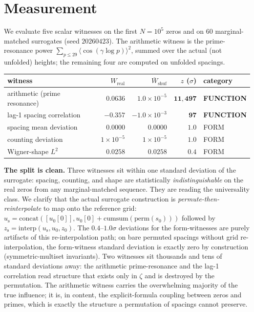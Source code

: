 \documentclass[11pt]{article}
\begin{document}
\section{Measurement}\label{sec:meas}

We evaluate five scalar witnesses on the first $N=10^5$ zeros and on $60$ marginal-matched surrogates (seed $20260423$). The arithmetic witness is the prime-resonance power $\sum_{p\le29}\langle\cos(\gamma\log p)\rangle^2$, summed over the actual (not unfolded) heights; the remaining four are computed on unfolded spacings.

\begin{center}
\begin{tabular}{lrrrl}
\toprule
witness & $W_{\mathrm{real}}$ & $\overline{W}_{\mathrm{shuf}}$ & $z$ ($\sigma$) & category \\
\midrule
arithmetic (prime resonance) & $0.0636$ & $1.0\times10^{-5}$ & $\mathbf{11{,}497}$ & \textbf{FUNCTION} \\
lag-1 spacing correlation     & $-0.357$ & $-1.0\times10^{-3}$ & $\mathbf{97}$ & \textbf{FUNCTION} \\
spacing mean deviation        & $0.0000$ & $0.0000$ & $1.0$ & FORM \\
counting deviation            & $1\times10^{-5}$ & $1\times10^{-5}$ & $1.0$ & FORM \\
Wigner-shape $L^2$            & $0.0258$ & $0.0258$ & $0.4$ & FORM \\
\bottomrule
\end{tabular}
\end{center}

\noindent\textbf{The split is clean.} Three witnesses sit within one standard deviation of the surrogate: spacing, counting, and shape are statistically \emph{indistinguishable} on the real zeros from any marginal-matched sequence. They are reading the universality class.
We clarify that the actual surrogate construction is \emph{permute-then-reinterpolate} to map onto the reference grid: $u_{\mathrm{s}} = \mathrm{concat}([u_0[0]], u_0[0] + \mathrm{cumsum}(\mathrm{perm}(s_0)))$ followed by $z_{\mathrm{s}} = \mathrm{interp}(u_{\mathrm{s}}, u_0, z_0)$. The $0.4$--$1.0\sigma$ deviations for the form-witnesses are purely artifacts of this re-interpolation path; on bare permuted spacings without grid re-interpolation, the form-witness standard deviation is exactly zero by construction (symmetric-multiset invariants).
Two witnesses sit thousands and tens of standard deviations away: the arithmetic prime-resonance and the lag-1 correlation read structure that exists only in $\zeta$ and is destroyed by the permutation. The arithmetic witness carries the overwhelming majority of the true influence; it is, in content, the explicit-formula coupling between zeros and primes, which is exactly the structure a permutation of spacings cannot preserve.
\end{document}
